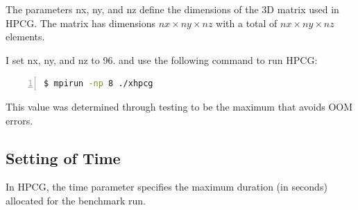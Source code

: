\documentclass{article}
\begin{document}




The parameters nx, ny, and nz define the dimensions of the 3D matrix used in HPCG. The matrix has dimensions $nx \times ny \times nz$ with a total of $nx \times ny \times nz$ elements.

\vspace{1em}

I set nx, ny, and nz to 96. and use the following command to run HPCG:

\begin{lstlisting}[language=bash, basicstyle=\ttfamily\small, numbers=left, numberstyle=\tiny\color{gray}, stepnumber=1, frame=single]
$ mpirun -np 8 ./xhpcg
\end{lstlisting}

This value was determined through testing to be the maximum that avoids OOM errors.

\subsection*{Setting of Time}

In HPCG, the time parameter specifies the maximum duration (in seconds) allocated for the benchmark run.

\vspace{1em}
\end{document}
